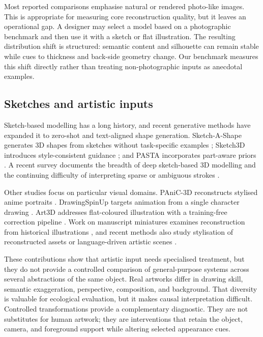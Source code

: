 \documentclass[12pt,a4paper]{article}
\begin{document}
Most reported comparisons emphasise natural or rendered photo-like images. This is appropriate for measuring core reconstruction quality, but it leaves an operational gap. A designer may select a model based on a photographic benchmark and then use it with a sketch or flat illustration. The resulting distribution shift is structured: semantic content and silhouette can remain stable while cues to thickness and back-side geometry change. Our benchmark measures this shift directly rather than treating non-photographic inputs as anecdotal examples.

\subsection{Sketches and artistic inputs}

Sketch-based modelling has a long history, and recent generative methods have expanded it to zero-shot and text-aligned shape generation. Sketch-A-Shape generates 3D shapes from sketches without task-specific examples \parencite{sanghi2023sketchashape}; Sketch3D introduces style-consistent guidance \parencite{zheng2024sketch3d}; and PASTA incorporates part-aware priors \parencite{lee2025pasta}. A recent survey documents the breadth of deep sketch-based 3D modelling and the continuing difficulty of interpreting sparse or ambiguous strokes \parencite{tono2026sketchsurvey}.

Other studies focus on particular visual domains. PAniC-3D reconstructs stylised anime portraits \parencite{chen2023panic3d}. DrawingSpinUp targets animation from a single character drawing \parencite{zhou2024drawingspinup}. Art3D addresses flat-coloured illustration with a training-free correction pipeline \parencite{cong2025art3d}. Work on manuscript miniatures examines reconstruction from historical illustrations \parencite{pallotto2026miniatures}, and recent methods also study stylisation of reconstructed assets or language-driven artistic scenes \parencite{oztas2025stylizationlrm,li2025artiscene}.

These contributions show that artistic input needs specialised treatment, but they do not provide a controlled comparison of general-purpose systems across several abstractions of the same object. Real artworks differ in drawing skill, semantic exaggeration, perspective, composition, and background. That diversity is valuable for ecological evaluation, but it makes causal interpretation difficult. Controlled transformations provide a complementary diagnostic. They are not substitutes for human artwork; they are interventions that retain the object, camera, and foreground support while altering selected appearance cues.
\end{document}
